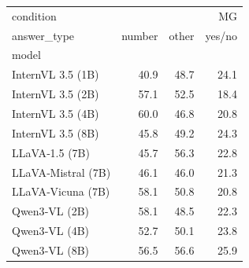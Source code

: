 \begin{tabular}{lrrr}
\toprule
condition & \multicolumn{3}{r}{MG} \\
answer_type & number & other & yes/no \\
model &  &  &  \\
\midrule
InternVL 3.5 (1B) & 40.9 & 48.7 & 24.1 \\
InternVL 3.5 (2B) & 57.1 & 52.5 & 18.4 \\
InternVL 3.5 (4B) & 60.0 & 46.8 & 20.8 \\
InternVL 3.5 (8B) & 45.8 & 49.2 & 24.3 \\
LLaVA‑1.5 (7B) & 45.7 & 56.3 & 22.8 \\
LLaVA‑Mistral (7B) & 46.1 & 46.0 & 21.3 \\
LLaVA‑Vicuna (7B) & 58.1 & 50.8 & 20.8 \\
Qwen3‑VL (2B) & 58.1 & 48.5 & 22.3 \\
Qwen3‑VL (4B) & 52.7 & 50.1 & 23.8 \\
Qwen3‑VL (8B) & 56.5 & 56.6 & 25.9 \\
\bottomrule
\end{tabular}
